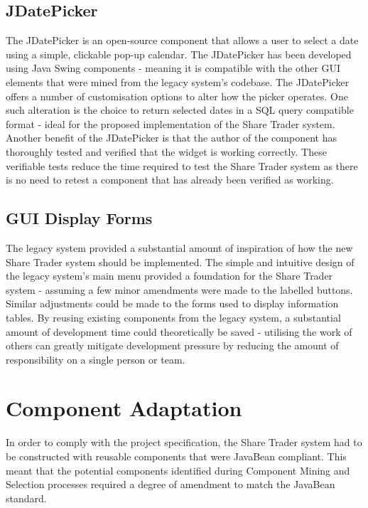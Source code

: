 \documentclass[12pt, a4paper,titlepage]{article}
\begin{document}
\subsection{JDatePicker}
The JDatePicker is an open-source component that allows a user to select a
date using a simple, clickable pop-up calendar.
The JDatePicker has been developed using Java Swing components - meaning it is
compatible with the other GUI elements that were mined from the legacy system's
codebase.
The JDatePicker offers a number of customisation options to alter how the
picker operates.
One such alteration is the choice to return selected dates in a SQL query
compatible format - ideal for the proposed implementation of the Share Trader
system.  
Another benefit of the JDatePicker is that the author of the component has
thoroughly tested and verified that the widget is working correctly. 
These verifiable tests reduce the time required to test the Share Trader system
as there is no need to retest a component that has already been verified as
working.

\subsection{GUI Display Forms}
The legacy system provided a substantial amount of inspiration of how the new
Share Trader system should be implemented. 
The simple and intuitive design of the legacy system’s main menu provided a
foundation for the Share Trader system - assuming a few minor amendments were
made to the labelled buttons.
Similar adjustments could be made to the forms used to display information
tables.  
By reusing existing components from the legacy system, a substantial
amount of development time could theoretically be saved - utilising the work
of others can greatly mitigate development pressure by reducing the amount of
responsibility on a single person or team.


\section{Component Adaptation}
In order to comply with the project specification, the  Share Trader system
had to be constructed with reusable components that were JavaBean compliant.
This meant that the potential components identified during Component Mining
and Selection processes  required a degree of amendment to match the JavaBean
standard. 
\end{document}
